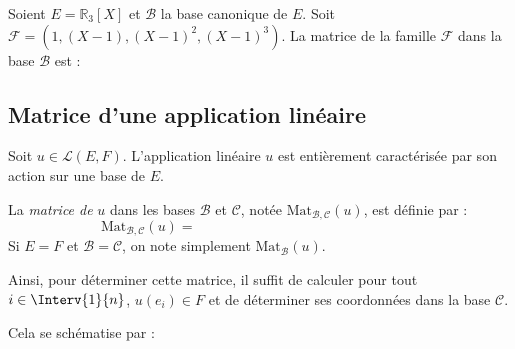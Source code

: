 \documentclass[a4paper,10pt]{report}
\begin{document}
\medskip

\begin{Exemple} Soient $E = \mathbb{R}_3[X]$ et $\mathcal{B}$ la base canonique de $E$. Soit $\mathcal{F}=(1,(X-1),(X-1)^2,(X-1)^3)$. La matrice de la famille $\mathcal{F}$ dans la base $\mathcal{B}$ est :

\vspace{5cm}


\end{Exemple}


\subsection{Matrice d'une application linéaire}

Soit $u \in \mathcal{L}(E,F)$. L'application linéaire $u$ est entièrement caractérisée par son action sur une base de $E$.

\begin{Definition}{} La \emph{matrice de} $u$ dans les bases $\mathcal{B}$ et $\mathcal{C}$, notée $\textrm{Mat}_{\mathcal{B}, \mathcal{C}}(u)$, est définie par :
$$ \textrm{Mat}_{\mathcal{B}, \mathcal{C}}(u)= \phantom{\textrm{Mat}_{\mathcal{C}}(u(e_1), u(e_2), \ldots, u(e_n))}$$
Si $E=F$ et $\mathcal{B}= \mathcal{C}$, on note simplement $\textrm{Mat}_{\mathcal{B}}(u)$.
\end{Definition}

Ainsi, pour déterminer cette matrice, il suffit de calculer pour tout $i \in \Interv{1}{n}$, $u(e_i) \in F$ et de déterminer ses coordonnées dans la base $\mathcal{C}$.


Cela se schématise par :

\end{document}
